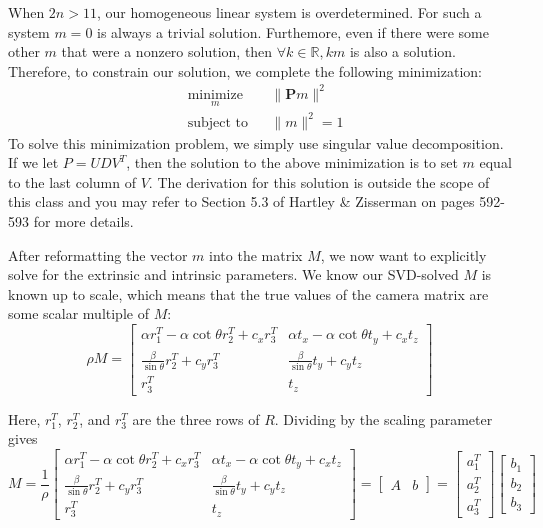 \documentclass[a4paper, 12pt]{article}
\begin{document}
When $2n > 11$, our homogeneous linear system is overdetermined. For such a system $m=0$ is always a trivial solution. Furthemore, even if there were some other $m$ that were a nonzero solution, then $\forall k\in \mathbb{R},km$ is also a solution. Therefore, to constrain our solution, we complete the following minimization:
\begin{equation}
\begin{aligned}
    & \underset{m}{\text{minimize}}
    & & \|\mathbf{P}m\|^2 \\
    & \text{subject to}
    & & \|m\|^2 = 1
\end{aligned}
\end{equation}
To solve this minimization problem, we simply use singular value decomposition. If we let $P = UDV^T$, then the solution to the above minimization is to set $m$ equal to the last column of $V$. The derivation for this solution is outside the scope of this class and you may refer to Section 5.3 of Hartley \& Zisserman on pages 592-593 for more details.

After reformatting the vector $m$ into the matrix $M$, we now want to explicitly solve for the extrinsic and intrinsic parameters. We know our SVD-solved $M$ is known up to scale, which means that the true values of the camera matrix are some scalar multiple of $M$:
\begin{equation}
\rho M = \begin{bmatrix}
\alpha r_1^T - \alpha\cot \theta r_2^T + c_xr_3^T & \alpha t_x - \alpha \cot \theta t_y + c_x t_z \\
\frac{\beta}{\sin\theta}r_2^T + c_yr_3^T & \frac{\beta}{\sin\theta}t_y + c_yt_z \\ r_3^T & t_z
\end{bmatrix}
\end{equation}

Here, $r_1^T$, $r_2^T$, and $r_3^T$ are the three rows of $R$. Dividing by the scaling parameter gives
\[M = \frac{1}{\rho}\begin{bmatrix}
\alpha r_1^T - \alpha\cot \theta r_2^T + c_xr_3^T & \alpha t_x - \alpha \cot \theta t_y + c_x t_z \\
\frac{\beta}{\sin\theta}r_2^T + c_yr_3^T & \frac{\beta}{\sin\theta}t_y + c_yt_z \\ r_3^T & t_z
\end{bmatrix} = \begin{bmatrix}A & b\end{bmatrix} =\begin{bmatrix}
a_1^T \\ a_2^T \\ a_3^T
\end{bmatrix} \begin{bmatrix}
b_1\\b_2\\b_3
\end{bmatrix}
\]
\end{document}
